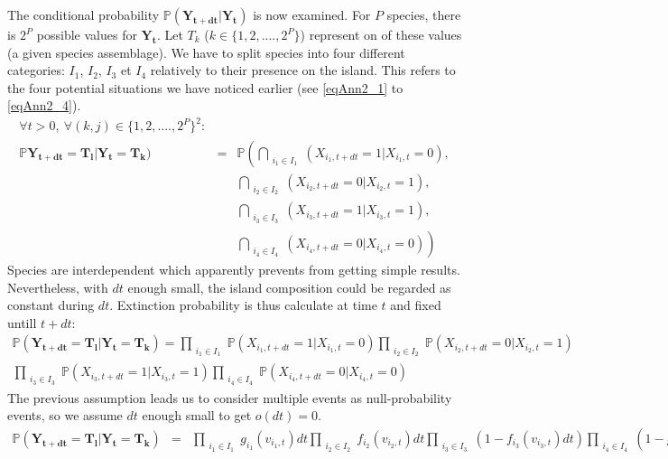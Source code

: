 The conditional probability $\mathbb{P}(\mathbf{Y_{t+dt}}|\mathbf{Y_t})$ is now examined. For $P$ species, there is $2^P$ possible values for $\mathbf{Y_t}$. Let $T_k$ ($k\in \{1, 2,...., 2^P\}$) represent on of these values (a given species assemblage). We have to split species into four different categories: $I_1$, $I_2$, $I_3$ et $I_4$ relatively to their presence on the island. This refers to the four potential situations we have noticed earlier (see \eqref{eqAnn2_1} to \eqref{eqAnn2_4}).
\begin{eqnarray}
\nonumber \forall{t} >0, ~\forall{(k,j)} \in \{1, 2,...., 2^P\}^2: & &\\
\nonumber \label{eqAnn2_12}  \mathbb{P} \mathbf{\mathbf{Y_{t+dt}}}=\mathbf{T_l}|\mathbf{\mathbf{Y_t}}=\mathbf{T_k})
 & = & \mathbb{P}\left(
    \bigcap_{\substack{i_1\in I_1}}(X_{i_1,t+dt}=1|X_{i_1,t}=0)\right., \\
  \nonumber & & \bigcap_{\substack{i_2\in I_2}}(X_{i_2,t+dt}=0|X_{i_2,t}=1), \\
  \nonumber & & \bigcap_{\substack{i_3\in I_3}}(X_{i_3,t+dt}=1|X_{i_3,t}=1), \\
  \label{eqAnn2_13} & & \left.\bigcap_{\substack{i_4\in I_4}}(X_{i_4,t+dt}=0|X_{i_4,t}=0)\right)
\end{eqnarray}
Species are interdependent which apparently prevents from getting simple results. Nevertheless,
with $dt$ enough small, the island composition could be regarded as constant during $dt$. Extinction probability is thus calculate at time $t$ and fixed untill $t+dt$:
\begin{eqnarray}
\nonumber \mathbb{P}(\mathbf{\mathbf{Y_{t+dt}}}=\mathbf{T_l}|\mathbf{\mathbf{Y_t}}=\mathbf{T_k})= \prod_{\substack{i_1\in I_1}}\mathbb{P}(X_{i_1,t+dt}=1|X_{i_1,t}=0)\prod_{\substack{i_2\in I_2}}\mathbb{P}(X_{i_2,t+dt}=0|X_{i_2,t}=1)  \\
\label{eqAnn2_13} \prod_{\substack{i_3\in I_3}}\mathbb{P}(X_{i_3,t+dt}=1|X_{i_3,t}=1) \prod_{\substack{i_4\in I_4}}\mathbb{P}(X_{i_4,t+dt}=0|X_{i_4,t}=0)
\end{eqnarray}
The previous assumption leads us to consider multiple events as null-probability events, so we assume $dt$ enough small to get $o(dt)=0$.
\begin{eqnarray}
\nonumber \mathbb{P}(\mathbf{\mathbf{Y_{t+dt}}}=\mathbf{T_l}|\mathbf{\mathbf{Y_t}}=\mathbf{T_k})&=&\prod_{\substack{i_1\in I_1}}g_{i_1}(v_{i_1,t})dt \prod_{\substack{i_2\in I_2}}f_{i_2}(v_{i_2,t})dt \prod_{\substack{i_3\in I_3}}(1-f_{i_3}(v_{i_3,t})dt )\prod_{\substack{i_4\in I_4}}(1-g_{i_4}(v_{i_4,t})dt) \\
\label{eqAnn2_2.4}
\end{eqnarray}



